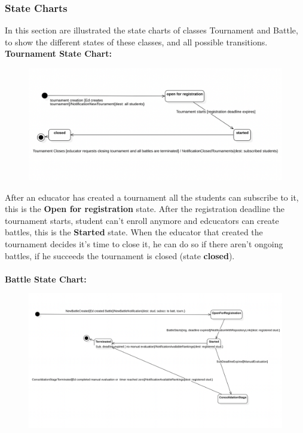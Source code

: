 \subsubsection{State Charts}
In this section are illustrated the state charts of classes Tournament and Battle, to show the different states of these classes, and all possible transitions.\\

\textbf{Tournament State Chart:}
\begin{figure}[h]
    \centering
    \includegraphics[width=1\textwidth]{RASD/2Overall_Description/res/st1.png}
\end{figure}

After an educator has created a tournament all the students can subscribe to it, this is the \textbf{Open for registration} state. After the registration deadline the tournament starts, student can't enroll anymore and edcucators can create battles, this is the \textbf{Started} state. When the educator that created the tournament decides it's time to close it, he can do so if there aren't ongoing battles, if he succeeds the tournament is closed (state \textbf{closed}).\\
\\
\clearpage
\textbf{Battle State Chart:}
\begin{figure}[h]
    \centering
    \includegraphics[width=1\textwidth]{RASD/2Overall_Description/res/stateChartBattle.png}
\end{figure}

